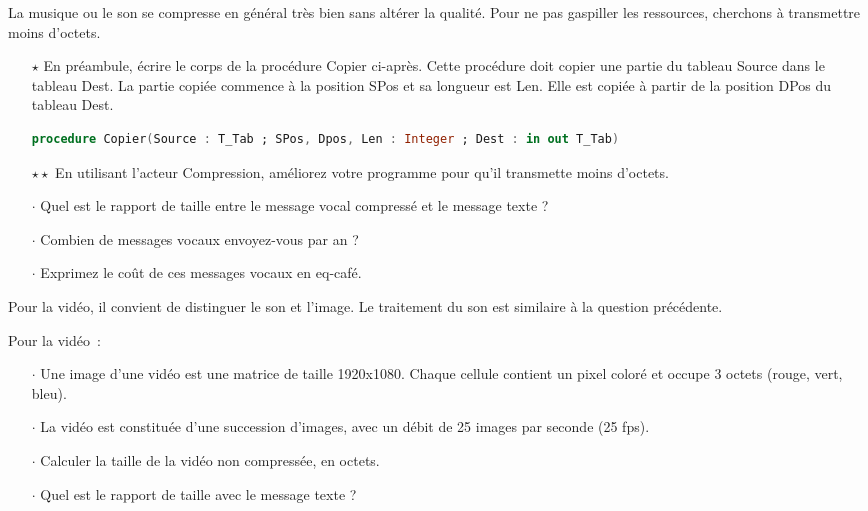 

La musique ou le son se compresse en général très bien sans altérer la qualité.
Pour ne pas gaspiller les ressources, cherchons à transmettre moins d'octets.

\begin{itemize}
\item[$\star$] En préambule, écrire le corps de la procédure Copier ci-après. Cette procédure doit copier une partie du tableau Source dans le tableau Dest.
  La partie copiée commence à la position SPos et sa longueur est Len. Elle est copiée à partir de la position DPos du tableau Dest.

  \begin{lstlisting}[language=Ada]
    procedure Copier(Source : T_Tab ; SPos, Dpos, Len : Integer ; Dest : in out T_Tab) 
  \end{lstlisting}
  
  \item[$\star\star$] En utilisant l'acteur Compression, améliorez votre programme pour qu'il transmette moins d'octets.
\end{itemize}

\begin{itemize}
\item[$\cdot$] Quel est le rapport de taille entre le message vocal compressé et le message texte ?
\item[$\cdot$] Combien de messages vocaux envoyez-vous par an ?
\item[$\cdot$] Exprimez le coût de ces messages vocaux en eq-café.
\end{itemize}






Pour la vidéo, il convient de distinguer le son et l'image. Le traitement du son est similaire à la question précédente.

Pour la vidéo~:

\begin{itemize}
\item[$\cdot$] Une image d'une vidéo est une matrice de taille 1920x1080. Chaque cellule contient un pixel coloré et occupe 3 octets (rouge, vert, bleu).
\item[$\cdot$] La vidéo est constituée d'une succession d'images, avec un débit de 25 images par seconde (25 fps).
\item[$\cdot$] Calculer la taille de la vidéo non compressée, en octets.
\item[$\cdot$] Quel est le rapport de taille avec le message texte ?
\end{itemize}

